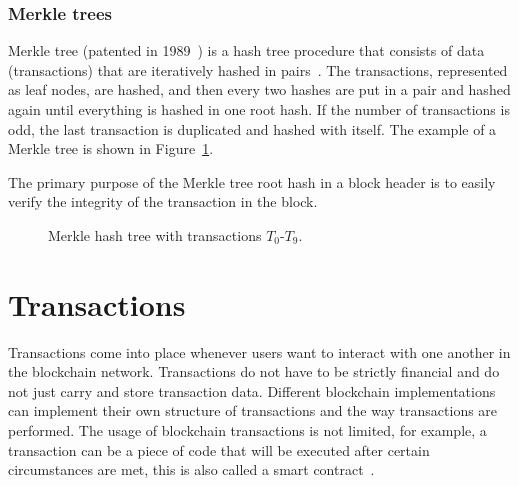 \subsubsection{Merkle trees}
\label{Merkle trees}

Merkle tree (patented in 1989~\cite{merkle.tree.patent}) is a hash tree procedure that consists of data (transactions) that are iteratively hashed in pairs~\cite{vademecun.blockchain}. The transactions, represented as leaf nodes, are hashed, and then every two hashes are put in a pair and hashed again until everything is hashed in one root hash. If the number of transactions is odd, the last transaction is duplicated and hashed with itself. The example of a Merkle tree is shown in Figure~\ref{figure:bc.merkle tree}.

The primary purpose of the Merkle tree root hash in a block header is to easily verify the integrity of the transaction in the block.

\begin{figure}[ht]
    \begin{center}
    \end{center}
    \caption{Merkle hash tree with transactions $T_0$-$T_9$.}
    \label{figure:bc.merkle tree}
\end{figure}



\section{Transactions}
\label{Transactions}

Transactions come into place whenever users want to interact with one another in the blockchain network. Transactions do not have to be strictly financial and do not just carry and store transaction data. Different blockchain implementations can implement their own structure of transactions and the way transactions are performed. The usage of blockchain transactions is not limited, for example, a transaction can be a piece of code that will be executed after certain circumstances are met, this is also called a smart contract~\cite{vademecun.blockchain}.

